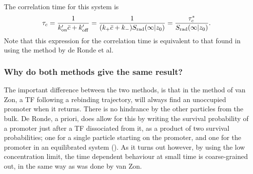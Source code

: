 The correlation time for this system is
\begin{equation}
 \tau_c = \frac{1}{k'_{\rm on} \bar{c} + k'_{\rm off}} = \frac{1}{ (k_+ \bar{c} + k_- ) S_{\rm rad}(\infty|z_0) } = \frac{\tau_c^*}{S_{\rm rad}(\infty|z_0)}.
\end{equation}
Note that this expression for the correlation time is equivalent to that found in  using the method by de Ronde et al. 

\subsubsection{Why do both methods give the same result?}
The important difference between the two methods, is that in the method of van Zon, a TF following a rebinding trajectory, will always find an unoccupied promoter when it returns. There is no hindrance by the other particles from the bulk. De Ronde, a priori, does allow for this by writing the survival probability of a promoter just after a TF dissociated from it, as a product of two survival probabilities; one for a single particle starting on the promoter, and one for the promoter in an equilibrated system (). As it turns out however, by using the low concentration limit, the time dependent behaviour at small time is coarse-grained out, in the same way as was done by van Zon.

